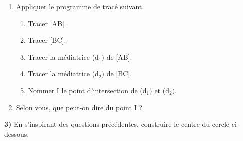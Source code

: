 \documentclass[activite]{thedocument}
\begin{document}
\begingroup\small
    \begin{minipage}{.45\linewidth}
        \begin{center}
        \end{center}
    \end{minipage}%
    \begin{minipage}{.5\linewidth}
        \begin{enumerate}
            \item Appliquer le programme de tracé suivant.
            \begin{enumerate}
                \item Tracer [\textsf{AB}].
                \item Tracer [\textsf{BC}].
                \item Tracer la médiatrice (d$_1)$ de [\textsf{AB}].
                \item Tracer la médiatrice (d$_2)$ de [\textsf{BC}].
                \item Nommer \textsf{I} le point d'intersection de (d$_1)$ et (d$_2)$.
            \end{enumerate}
            \item Selon vous, que peut-on dire du point \textsf{I} ?
            \dotedline
        \end{enumerate}
    \end{minipage}\endgroup
    \begin{flushleft}
        \textbf{3)} En s'inspirant des questions précédentes, construire le centre du
                cercle ci-dessous.
    \end{flushleft}
    \begin{center}
    \end{center}
\end{document}

